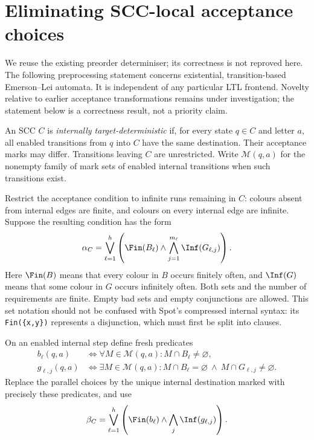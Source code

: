 \section{Eliminating SCC-local acceptance choices}
\label{sec:colour-choice}

We reuse the existing preorder determiniser; its correctness is not reproved
here. The following preprocessing statement concerns existential,
transition-based Emerson--Lei automata. It is independent of any particular
LTL frontend. Novelty relative to earlier acceptance transformations remains
under investigation; the statement below is a correctness result, not a
priority claim.

\begin{definition}
An SCC $C$ is \emph{internally target-deterministic} if, for every state
$q\in C$ and letter $a$, all enabled transitions from $q$ into $C$ have
the same destination. Their acceptance marks may differ. Transitions
leaving $C$ are unrestricted. Write $\mathcal M(q,a)$ for the nonempty
family of mark sets of enabled internal transitions when such transitions
exist.
\end{definition}

Restrict the acceptance condition to infinite runs remaining in $C$:
colours absent from internal edges are finite, and colours on every
internal edge are infinite. Suppose the resulting condition has the form
\[
 \alpha_C=\bigvee_{\ell=1}^h\left(\Fin(B_\ell)\land
                    \bigwedge_{j=1}^{m_\ell}\Inf(G_{\ell,j})\right).
\]
Here $\Fin(B)$ means that every colour in $B$ occurs finitely often,
and $\Inf(G)$ means that some colour in $G$ occurs infinitely often.
Both sets and the number of requirements are finite. Empty bad sets and
empty conjunctions are allowed. This set notation should not be confused
with Spot's compressed internal syntax: its \texttt{Fin(\{x,y\})}
represents a disjunction, which must first be split into clauses.

On an enabled internal step define fresh predicates
\begin{align*}
 b_\ell(q,a)&\iff
       \forall M\in\mathcal M(q,a): M\cap B_\ell\ne\varnothing,\\
 g_{\ell,j}(q,a)&\iff
       \exists M\in\mathcal M(q,a):
         M\cap B_\ell=\varnothing\ \land\ M\cap G_{\ell,j}\ne\varnothing.
\end{align*}
Replace the parallel choices by the unique internal destination marked
with precisely these predicates, and use
\[
 \beta_C=\bigvee_{\ell=1}^h\left(\Fin(b_\ell)\land
                          \bigwedge_j\Inf(g_{\ell,j})\right).
\]

